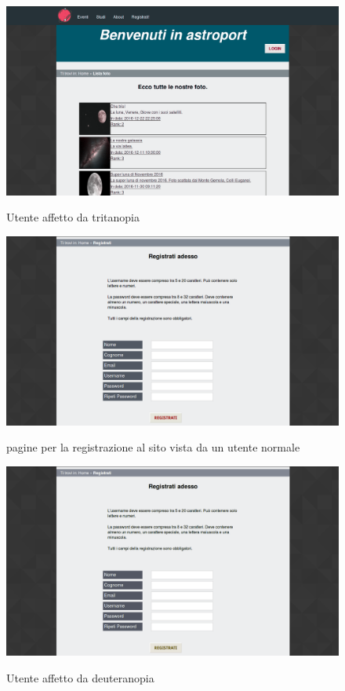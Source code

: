 	\begin{figure}
	\includegraphics[scale=0.3]{images/tritanopia.jpg}\\[1cm] \caption{Utente affetto da tritanopia}
	\end{figure}
	\begin{figure}
	\includegraphics[scale=0.3]{images/test2.png}\\[1cm] \caption{pagine per la registrazione al sito vista da un utente normale} \end{figure}
	\begin{figure}
	\includegraphics[scale=0.3]{images/deuteranopia2.jpg}\\[1cm] \caption{Utente affetto da deuteranopia} \end{figure}
